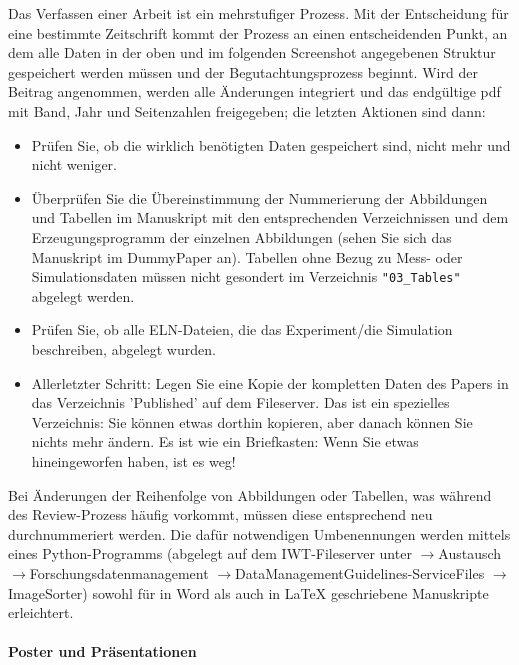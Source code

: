 Das Verfassen einer Arbeit ist ein mehrstufiger Prozess. Mit der Entscheidung für eine bestimmte Zeitschrift kommt der Prozess an einen entscheidenden Punkt, an dem alle Daten in der oben und im folgenden Screenshot angegebenen Struktur gespeichert werden müssen und der Begutachtungsprozess beginnt. Wird der Beitrag angenommen, werden alle Änderungen integriert und das endgültige pdf mit Band, Jahr und Seitenzahlen freigegeben; die letzten Aktionen sind dann:
\begin{itemize}
  \item Prüfen Sie, ob die wirklich benötigten Daten gespeichert sind, nicht
        mehr und nicht weniger.
  \item Überprüfen Sie die Übereinstimmung der Nummerierung der Abbildungen und
        Tabellen im Manuskript mit den entsprechenden Verzeichnissen und dem
        Erzeugungsprogramm der einzelnen Abbildungen (sehen Sie sich das
        Manuskript im DummyPaper an). Tabellen ohne Bezug zu Mess- oder Simulationsdaten
        müssen nicht gesondert im Verzeichnis \texttt{"03\_Tables"} abgelegt werden.
  \item Prüfen Sie, ob alle ELN-Dateien, die das Experiment/die Simulation
        beschreiben, abgelegt wurden.
  \item Allerletzter Schritt: Legen Sie eine Kopie der kompletten Daten des
        Papers in das Verzeichnis 'Published' auf dem Fileserver. Das ist ein
        spezielles Verzeichnis: Sie können etwas dorthin kopieren, aber danach
        können Sie nichts mehr ändern. Es ist wie ein Briefkasten: Wenn Sie
        etwas hineingeworfen haben, ist es weg!
\end{itemize}

Bei Änderungen der Reihenfolge von Abbildungen oder Tabellen, was während des Review-Prozess häufig vorkommt, müssen diese entsprechend neu durchnummeriert werden. Die dafür notwendigen Umbenennungen werden mittels eines Python-Programms (abgelegt auf dem IWT-Fileserver unter $\rightarrow$Austausch $\rightarrow$Forschungsdatenmanagement $\rightarrow$DataManagement\-Guidelines-ServiceFiles  $\rightarrow$ImageSorter) sowohl für in Word als auch in LaTeX geschriebene Manuskripte erleichtert.


\paragraph{Poster und Präsentationen}

